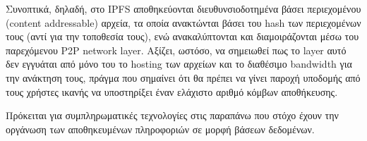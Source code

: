 Συνοπτικά, δηλαδή, στο IPFS αποθηκεύονται διευθυνσιοδοτημένα βάσει περιεχομένου (\textenglish{content addressable}) αρχεία, τα οποία ανακτώνται βάσει του hash των περιεχομένων τους (αντί για την τοποθεσία τους), ενώ ανακαλύπτονται και διαμοιράζονται μέσω του παρεχόμενου P2P network layer. Αξίζει, ωστόσο, να σημειωθεί πως το layer αυτό δεν εγγυάται από μόνο του το hosting των αρχείων και το διαθέσιμο bandwidth για την ανάκτηση τους, πράγμα που σημαίνει ότι θα πρέπει να γίνει παροχή υποδομής από τους χρήστες ικανής να υποστηρίξει έναν ελάχιστο αριθμό κόμβων αποθήκευσης.

Πρόκειται για συμπληρωματικές τεχνολογίες στις παραπάνω που στόχο έχουν την οργάνωση των αποθηκευμένων πληροφοριών σε μορφή βάσεων δεδομένων.
